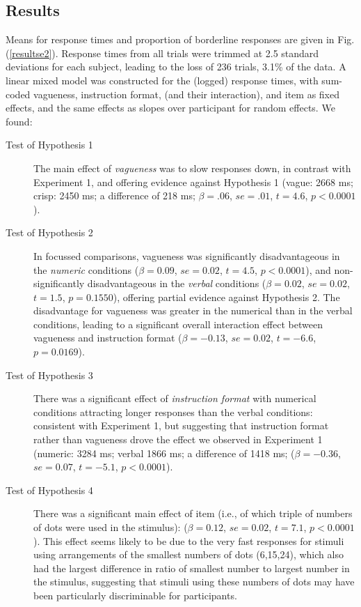 \subsection{Results} 

Means for response times and proportion of borderline responses are given in Fig. (\ref{resultse2}). 
Response times from all trials were trimmed at 2.5 standard deviations for each subject, leading to the loss of 236 trials, 3.1\% of the data. 
A linear mixed model was constructed for the (logged) response times, 
with sum-coded vagueness, instruction format, (and their interaction), and item as fixed effects, and the same effects as slopes over participant for random effects. We found:

\begin{description}
	\item [Test of Hypothesis 1] The main effect of \emph{vagueness} was to slow responses down, in contrast with Experiment 1, and offering evidence against Hypothesis 1 (vague: 2668 ms; crisp: 2450 ms; a difference of 218 ms; $\beta=.06$, $se=.01$, $t=4.6$, $p<0.0001$). 
	\item [Test of Hypothesis 2] In focussed comparisons, vagueness was significantly disadvantageous in the \emph{numeric} conditions ($\beta=0.09$, $se=0.02$, $t=4.5$, $p<0.0001$), and non-significantly disadvantageous in the \emph{verbal} conditions ($\beta=0.02$, $se=0.02$, $t=1.5$, $p=0.1550$), offering partial evidence against Hypothesis 2. The disadvantage for vagueness was greater in the numerical than in the verbal conditions, leading to a significant overall interaction effect between vagueness and instruction format ($\beta=-0.13$, $se=0.02$, $t=-6.6$, $p=0.0169$).
	\item [Test of Hypothesis 3] There was a significant effect of \emph{instruction format} with numerical conditions attracting longer responses than the verbal conditions: consistent with Experiment 1, but suggesting that instruction format rather than vagueness drove the effect we observed in Experiment 1 (numeric: 3284 ms; verbal 1866 ms; a difference of 1418 ms; ($\beta=-0.36$, $se=0.07$, $t=-5.1$, $p<0.0001$).
	\item [Test of Hypothesis 4] There was a significant main effect of item (i.e., of which triple of numbers of dots were used in the stimulus): ($\beta=0.12$, $se=0.02$, $t=7.1$, $p<0.0001$). This effect seems likely to be due to the very fast responses for stimuli using arrangements of the smallest numbers of dots (6,15,24), which also had the largest difference in ratio of smallest number to largest number in the stimulus, suggesting that stimuli using these numbers of dots may have been particularly discriminable for participants.
\end{description}

